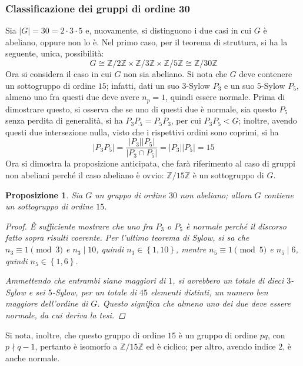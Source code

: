 \documentclass[12pt]{scrartcl}
\theoremstyle{style}
\newtheorem{prop}{Proposizione}[section]
\numberwithin{equation}{subsection}
\begin{document}
\subsubsection{Classificazione dei gruppi di ordine 30}
Sia $\lvert G \rvert  = 30 = 2\cdot 3\cdot 5$ e, nuovamente, si distinguono i due casi in cui $G$ \`e abeliano, oppure non lo \`e.
Nel primo caso, per il teorema di struttura, si ha la seguente, unica, possibilit\`a:
\[
G \cong \mathbb{Z}/2\mathbb{Z}\times  \mathbb{Z}/3\mathbb{Z}\times \mathbb{Z}/5\mathbb{Z} \cong \mathbb{Z}/30\mathbb{Z}
\] 
Ora si considera il caso in cui $G$ non sia abeliano.
Si nota che $G$ deve contenere un sottogruppo di ordine $15$; infatti, dati un suo $3$-Sylow $P_3$ e un suo $5$-Sylow $P_5$, almeno uno fra questi due deve avere $n_p =1$, quindi essere normale.
Prima di dimostrare questo, si osserva che se uno di questi due \`e normale, sia questo $P_5$ senza perdita di generalit\`a, si ha $P_3P_5=P_5P_3$, per cui $P_3P_5 < G$; inoltre, avendo questi due intersezione nulla, visto che i rispettivi ordini sono coprimi, si ha 
\[
\lvert P_3P_5 \rvert = \frac{\lvert P_3 \rvert \lvert P_5 \rvert }{\lvert P_3\cap P_5 \rvert } = \lvert P_3 \rvert \lvert P_5 \rvert =15
\] 
Ora si dimostra la proposizione anticipata, che far\`a riferimento al caso di gruppi non abeliani perch\'e il caso abeliano \`e ovvio: $\mathbb{Z}/15\mathbb{Z}$ \`e un sottogruppo di $G$.
\begin{prop}
	Sia $G$ un gruppo di ordine $30$ non abeliano; allora $G$ contiene un sottogruppo di ordine $15$.
	\begin{proof}
		\`E sufficiente mostrare che uno fra $P_3$ o $P_5$ \`e normale perch\'e il discorso fatto sopra risulti coerente.
		Per l'ultimo teorema di Sylow, si sa che $n_3 \equiv 1 \pmod{3} $ e $n_3  \mid 10$, quindi $n_3 \in \left\{ 1,10 \right\} $, mentre $n_5 \equiv 1 \pmod{5} $ e $n_5  \mid 6$, quindi $n_5 \in \left\{ 1,6 \right\} $.

		Ammettendo che entrambi siano maggiori di $1$, si avrebbero un totale di dieci $3$-Sylow e sei $5$-Sylow, per un totale di $45$ elementi distinti, un numero ben maggiore dell'ordine di $G$.
		Questo significa che almeno uno dei due deve essere normale, da cui deriva la tesi.
	\end{proof}
\end{prop}
\noindent Si nota, inoltre, che questo gruppo di ordine $15$ \`e un gruppo di ordine $pq$, con $p \nmid q-1$, pertanto \`e isomorfo a $\mathbb{Z}/15\mathbb{Z}$ ed \`e ciclico; per altro, avendo indice $2$, \`e anche normale.
\end{document}
